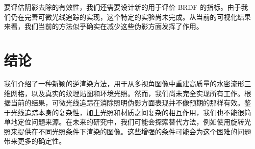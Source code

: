 要评估阴影去除的有效性，我们还需要设计新的用于评价 BRDF 的指标。由于我们仍在完善可微光线追踪的实现，这个特定的实验尚未完成。从当前的可视化结果来看，我们当前的方法似乎确实在减少这些伪影方面发挥了作用。

\section{结论}

我们介绍了一种新颖的逆渲染方法，用于从多视角图像中重建高质量的水密流形三维网格，以及真实的纹理贴图和环境光照。然而，我们尚未完全实现所有工作。根据当前的结果，可微光线追踪在消除照明伪影方面表现并不像预期的那样有效。鉴于光线追踪本身的复杂性，加上光照和材质之间复杂的相互作用，我们也不能很简单地定位问题来源。在未来的研究中，我们可能会探索替代方法，例如使用旋转光照来提供在不同光照条件下渲染的图像。这些增强的条件可能会为这个困难的问题带来更多的确定性。